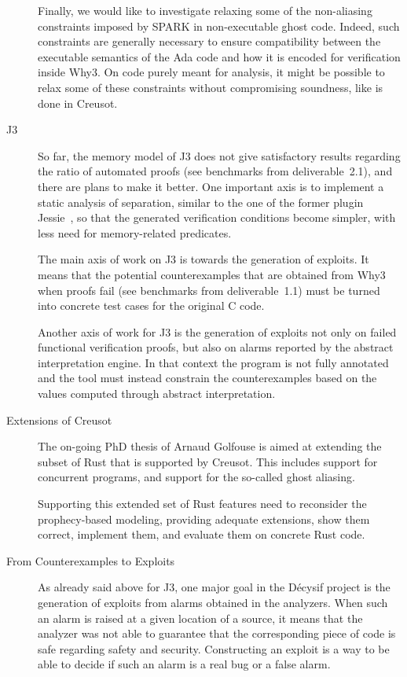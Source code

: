\documentclass[a4paper,11pt]{article}
\begin{document}
\begin{description}
  Finally, we would like to investigate relaxing some of the non-aliasing constraints
  imposed by SPARK in non-executable ghost code. Indeed, such constraints are
  generally necessary to ensure compatibility between the executable semantics
  of the Ada code and how it is encoded for verification inside Why3. On code purely
  meant for analysis, it might be possible to relax some of these constraints without
  compromising soundness, like is done in Creusot.

\item[J3]

  So far, the memory model of J3 does not give satisfactory results regarding
  the ratio of automated proofs (see benchmarks from deliverable~2.1), and
  there are plans to make it better. One important axis is to implement a static
  analysis of separation, similar to the one of the former plugin
  Jessie~\cite{hubert2008these,hubert07hav}, so that the generated verification
  conditions become simpler, with less need for memory-related predicates.

  The main axis of work on J3 is towards the generation of exploits. It means
  that the potential counterexamples that are obtained from Why3 when proofs
  fail (see benchmarks from deliverable~1.1) must be turned into concrete test
  cases for the original C code.

  Another axis of work for J3 is the generation of exploits not only on failed functional verification proofs, but also on alarms reported by the abstract interpretation engine. In that context the program is not fully annotated and the tool must instead constrain the counterexamples based on the values computed through abstract interpretation.

\item[Extensions of Creusot]

  The on-going PhD thesis of Arnaud Golfouse is aimed at extending the subset of
  Rust that is supported by Creusot. This includes support for concurrent
  programs, and support for the so-called ghost aliasing.

  Supporting this extended set of Rust features need to reconsider the
  prophecy-based modeling, providing adequate extensions, show them correct,
  implement them, and evaluate them on concrete Rust code.

\item[From Counterexamples to Exploits]

  As already said above for J3, one major goal in the Décysif project is the
  generation of exploits from alarms obtained in the analyzers. When such an
  alarm is raised at a given location of a source, it means that the analyzer
  was not able to guarantee that the corresponding piece of code is safe
  regarding safety and security. Constructing an exploit is a way to be able to
  decide if such an alarm is a real bug or a false alarm.


\end{description}
\end{document}
